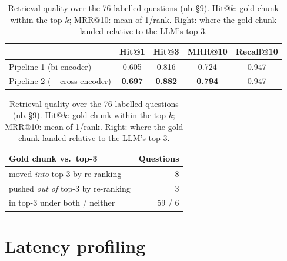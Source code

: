 \documentclass[10pt,a4paper]{article}
\newcommand{\nb}[1]{\textcolor{inktwo}{\small(nb.\,\S#1)}}   %
\begin{document}
\begin{table}[H]
\centering\footnotesize
\caption{Retrieval quality over the 76 labelled questions \nb{9}. Hit@$k$: gold chunk within the top $k$;
MRR@10: mean of 1/rank. Right: where the gold chunk landed relative to the LLM's top-3.}
\label{tab:eval}
\begin{tabular}[t]{@{}lcccc@{}}
\toprule
 & Hit@1 & Hit@3 & MRR@10 & Recall@10 \\
\midrule
Pipeline 1 (bi-encoder)      & 0.605 & 0.816 & 0.724 & 0.947 \\
Pipeline 2 (+ cross-encoder) & \textbf{0.697} & \textbf{0.882} & \textbf{0.794} & 0.947 \\
\bottomrule
\end{tabular}
\hspace{1.2em}
\begin{tabular}[t]{@{}lr@{}}
\toprule
Gold chunk vs.\ top-3 & Questions \\
\midrule
moved \emph{into} top-3 by re-ranking & 8 \\
pushed \emph{out of} top-3 by re-ranking & 3 \\
in top-3 under both / neither & 59 / 6 \\
\bottomrule
\end{tabular}
\end{table}

\section{Latency profiling}
\end{document}
